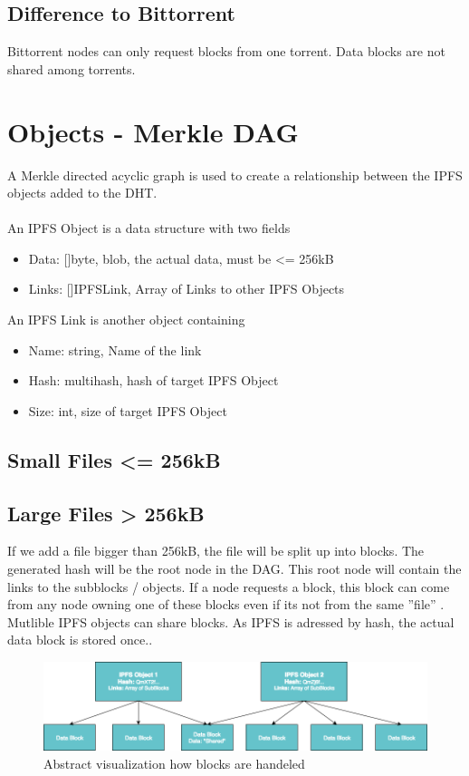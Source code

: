 \documentclass[a4paper,11pt, oneside]{report}
\theoremstyle{definition}
\begin{document}
\subsection{Difference to Bittorrent}

Bittorrent nodes can only request blocks from one torrent. Data blocks are not shared among torrents.



\newpage

\section{Objects - Merkle DAG}
A Merkle directed acyclic graph is used to create a relationship between the IPFS objects added to the DHT.\\ \\
An IPFS Object is a data structure with two fields
\begin{itemize}
\item Data: []byte, blob, the actual data, must be <= 256kB
\item Links: []IPFSLink, Array of Links to other IPFS Objects
\end{itemize}
An IPFS Link is another object containing
\begin{itemize}
\item Name: string, Name of the link
\item Hash: multihash, hash of target IPFS Object
\item Size: int, size of target IPFS Object
\end{itemize}

\subsection{Small Files <= 256kB}

\newpage
\subsection{Large Files > 256kB}
If we add a file bigger than 256kB, the file will be split up into blocks. The generated hash will be the root node in the DAG. This root node will contain the links to the subblocks / objects. If a node requests a block, this block can come from any node owning one of these blocks even if its not from the same ''file'' \cite{fileblock}. Mutlible IPFS objects can share blocks. As IPFS is adressed by hash, the actual data block is stored once.\cite{fileblock2}. \\[0.3cm]
\begin{figure}[H]
\centering
\includegraphics[width=\textwidth]{img/ipfs-fileblocks.png}
\caption[Objects \& Blocks]{Abstract visualization how blocks are handeled}
\end{figure}
\end{document}
